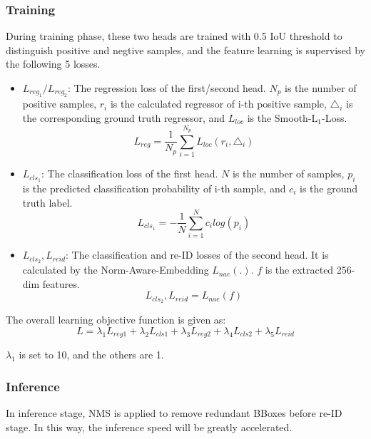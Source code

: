 \documentclass[letterpaper]{article} \usepackage{aaai21}  \usepackage{times}  \usepackage{helvet} \usepackage{courier}  \usepackage[hyphens]{url}  \usepackage{graphicx} \urlstyle{rm} \def\UrlFont{\rm}  \usepackage{natbib}  \usepackage{caption} \usepackage{multirow}
\begin{document}
\subsubsection{Training}
During training phase, these two heads are trained with 0.5 IoU threshold to distinguish positive and negtive samples, and the feature learning is supervised by the following 5 losses.
\begin{itemize}
    \item $L_{reg_1}/L_{reg_2}$: The regression loss of the first/second head. $N_p$ is the number of positive samples, $r_i$ is the calculated regressor of i-th positive sample, $\triangle_i$ is the corresponding ground truth regressor, and $L_{loc}$ is the Smooth-L$_1$-Loss.
          \begin{equation}
              L_{reg}=\frac{1}{N_p}\sum_{i=1}^{N_p}L_{loc}(r_i,\triangle_i)
          \end{equation}
    \item $L_{cls_1}$: The classification loss of the first head. $N$ is the number of samples, $p_i$ is the predicted classification probability of i-th sample, and $c_i$ is the ground truth label.
          \begin{equation}
              L_{cls_1}=-\frac{1}{N}\sum_{i=1}^{N}c_ilog(p_i)
          \end{equation}
    \item $L_{cls_2},L_{reid}$: The classification and re-ID losses of the second head. It is calculated by the Norm-Aware-Embedding $L_{nae}(.)$. $f$ is the extracted 256-dim features.
          \begin{equation}
              L_{cls_2},L_{reid}=L_{nae}(f)
          \end{equation}
\end{itemize}

The overall learning objective function is given as:
\begin{equation}
    L = \lambda_1L_{reg1} + \lambda_2L_{cls1} + \lambda_3L_{reg2} + \lambda_4L_{cls2} + \lambda_5L_{reid}
\end{equation}

$\lambda_1$ is set to 10, and the others are 1.

\subsubsection{Inference}
In inference stage, NMS is applied to remove redundant BBoxes before re-ID stage. In this way, the inference speed will be greatly accelerated.
\end{document}
